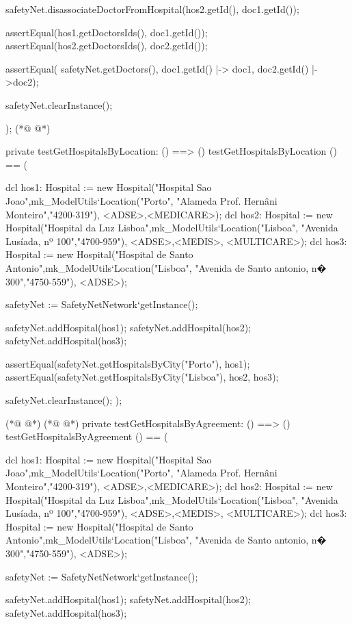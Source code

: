 \begin{vdmpp}[breaklines=true]
  
  safetyNet.disassociateDoctorFromHospital(hos2.getId(), doc1.getId());

  assertEqual(hos1.getDoctorsIds(), {doc1.getId()});
  assertEqual(hos2.getDoctorsIds(), {doc2.getId()});
  
  assertEqual( safetyNet.getDoctors(), {doc1.getId() |-> doc1, doc2.getId() |->doc2});
  
  safetyNet.clearInstance();
    
);
(*@
\label{testGetHospitalsById:314}
@*)

private testGetHospitalsByLocation: () ==> ()
 testGetHospitalsByLocation () == (
   
  dcl hos1: Hospital := new Hospital("Hospital Sao Joao",mk_ModelUtils`Location("Porto", "Alameda Prof. Hernâni Monteiro","4200-319"), {<ADSE>,<MEDICARE>});
  dcl hos2: Hospital := new Hospital("Hospital da Luz Lisboa",mk_ModelUtils`Location("Lisboa", "Avenida Lusíada, nº 100","4700-959"), {<ADSE>,<MEDIS>, <MULTICARE>});
  dcl hos3: Hospital := new Hospital("Hospital de Santo Antonio",mk_ModelUtils`Location("Lisboa", "Avenida de Santo antonio, n� 300","4750-559"), {<ADSE>});
  
  safetyNet := SafetyNetNetwork`getInstance();
   
  safetyNet.addHospital(hos1);
  safetyNet.addHospital(hos2);
  safetyNet.addHospital(hos3);
 
  assertEqual(safetyNet.getHospitalsByCity("Porto"), {hos1});
  assertEqual(safetyNet.getHospitalsByCity("Lisboa"), {hos2, hos3});
 
  safetyNet.clearInstance();
);

(*@
\label{testGetHospitalsByAgreement:334}
@*)
(*@
\label{testGetAllHospitals:334}
@*)
private testGetHospitalsByAgreement: () ==> ()
 testGetHospitalsByAgreement () == (
   
  dcl hos1: Hospital := new Hospital("Hospital Sao Joao",mk_ModelUtils`Location("Porto", "Alameda Prof. Hernâni Monteiro","4200-319"), {<ADSE>,<MEDICARE>});
  dcl hos2: Hospital := new Hospital("Hospital da Luz Lisboa",mk_ModelUtils`Location("Lisboa", "Avenida Lusíada, nº 100","4700-959"), {<ADSE>,<MEDIS>, <MULTICARE>});
  dcl hos3: Hospital := new Hospital("Hospital de Santo Antonio",mk_ModelUtils`Location("Lisboa", "Avenida de Santo antonio, n� 300","4750-559"), {<ADSE>});
  
  safetyNet := SafetyNetNetwork`getInstance();
   
  safetyNet.addHospital(hos1);
  safetyNet.addHospital(hos2);
  safetyNet.addHospital(hos3);
 

\end{vdmpp}
